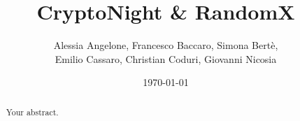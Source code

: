 \documentclass{report}
\title{CryptoNight \& RandomX} %
\author{Alessia Angelone, Francesco Baccaro, Simona Bertè, \\ Emilio Cassaro, Christian Coduri, Giovanni Nicosia}
\date{\today}
\begin{document}
\maketitle

\begin{abstract}
Your abstract.
\end{abstract}





\end{document}

